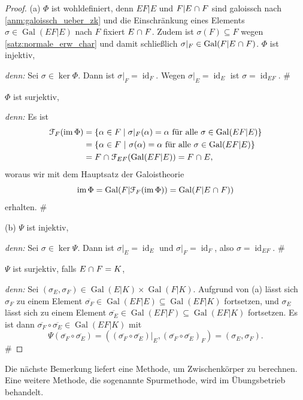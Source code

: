 \documentclass[a4paper, twoside, 11pt, ngerman]{report}
\newcommand{\calF}{\mathcal F}
\DeclareMathOperator{\Gal}{Gal}
\DeclareMathOperator{\ident}{id}
\DeclareMathOperator{\image}{im}
\renewcommand{\cap}{\;\rotatebox{90}{\reflectbox{\rotatebox{270}{$\cup$}}}\;}
\theoremstyle{definistyle}
\theoremstyle{remark}
\newenvironment{denn}%
  {\par\textit{denn:}}%
  {\hfill\#\par}
\begin{document}
\begin{proof}
(a) $\Phi$ ist wohldefiniert, denn $EF|E$ und $F|E\cap F$ sind galoissch nach \ref{anm:galoissch_ueber_zk} und die Einschränkung eines Elements $\sigma\in\Gal(EF|E)$ nach $F$ fixiert $E\cap F$. Zudem ist $\sigma(F)\subseteq F$ wegen \ref{satz:normale_erw_char}
und damit schließlich $\sigma|_F\in\Gal(F|E\cap F)$.
$\Phi$ ist injektiv,
\begin{denn}
Sei $\sigma \in \ker \Phi$. Dann ist $\sigma|_F = \ident_F$. Wegen $\sigma|_E=\ident_E$ ist 
$\sigma = \ident_{EF}$.
\end{denn}
$\Phi$ ist surjektiv,
\begin{denn}
Es ist
\begin{align*}
\calF_F(\image\Phi) &= \{ \alpha \in F \mid \sigma|_F(\alpha) = \alpha \text{ für alle } \sigma \in \Gal(EF|E) \}\\  
&= \{ \alpha\in F \ | \ \sigma(\alpha)=\alpha \text{ für alle } \sigma \in \Gal(EF|E) \}\\
&= F \cap \calF_{EF}(\Gal(EF|E)) = F \cap E,
\end{align*}
woraus wir mit dem Hauptsatz der Galoistheorie
\[
\image\Phi=\Gal(F|\calF_F(\image\Phi))=\Gal(F|E\cap F))
\]
erhalten.
\end{denn}
\item[(b)] $\Psi$ ist injektiv,
\begin{denn}
Sei $\sigma \in \ker\Psi$. Dann ist $\sigma|_E = \operatorname{id}_E$ und $\sigma|_F = \operatorname{id}_F$, also $\sigma = \operatorname{id}_{EF}$.
\end{denn}
$\Psi$ ist surjektiv, falls $E \cap F = K$,
\begin{denn}
Sei $(\sigma_E, \sigma_F) \in \Gal(E|K) \times \Gal(F|K)$. Aufgrund von (a) lässt sich $\sigma_F$ zu einem
Element $\overline{\sigma_F}\in\Gal(EF|E)\subseteq\Gal(EF|K)$ fortsetzen, und $\sigma_E$ lässt sich
zu einem Element $\overline{\sigma_E}\in\Gal(EF|F)\subseteq\Gal(EF|K)$ fortsetzen. Es ist dann
$\overline{\sigma_F}\circ\overline{\sigma_E}\in\Gal(EF|K)$ mit
\[
\Psi(\overline{\sigma_F}\circ\overline{\sigma_E})=((\overline{\sigma_F}\circ\overline{\sigma_E})|_E,(\overline{\sigma_F}\circ\overline{\sigma_E})_F)=(\sigma_E,\sigma_F).
\]
\end{denn}
\end{proof}

Die nächste Bemerkung liefert eine Methode, um Zwischenkörper zu berechnen. Eine weitere Methode, die sogenannte Spurmethode, wird im Übungsbetrieb behandelt.
\end{document}

